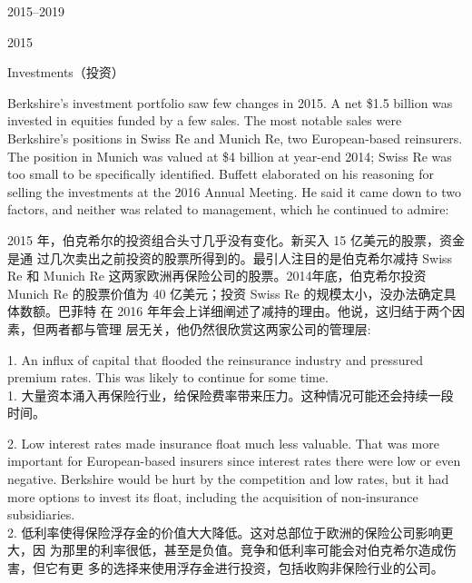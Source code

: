 \begin{chapter}{2015--2019}
\begin{section}{2015}
\begin{subsection}{Investments（投资）}
\begin{verseparallel}
{    Berkshire's investment portfolio saw few changes in 2015. A net \$1.5
    billion was invested in equities funded by a few sales. The most notable
    sales were Berkshire’s positions in Swiss Re and Munich Re, two
    European-based reinsurers. The position in Munich was valued at \$4 billion
    at year-end 2014; Swiss Re was too small to be specifically identified.
    Buffett elaborated on his reasoning for selling the investments at the 2016
    Annual Meeting. He said it came down to two factors, and neither was
    related to management, which he continued to admire:    

  }
  {
    2015 年，伯克希尔的投资组合头寸几乎没有变化。新买入 15 亿美元的股票，资金是通
    过几次卖出之前投资的股票所得到的。最引人注目的是伯克希尔减持 Swiss
    Re 和 Munich Re 这两家欧洲再保险公司的股票。2014年底，伯克希尔投资 Munich Re
    的股票价值为 40 亿美元；投资 Swiss Re 的规模太小，没办法确定具体数额。巴菲特
    在 2016 年年会上详细阐述了减持的理由。他说，这归结于两个因素，但两者都与管理
    层无关，他仍然很欣赏这两家公司的管理层:
  }
\end{verseparallel}    

{\color{green}{此处应为列表项 \\}}

\begin{verseparallel}
  {
    1. An influx of capital that flooded the reinsurance industry and pressured
    premium rates. This was likely to continue for some time. \\
  }
  {
    1. 大量资本涌入再保险行业，给保险费率带来压力。这种情况可能还会持续一段时间。
  }
\end{verseparallel}

\begin{verseparallel}
  {
    2. Low interest rates made insurance float much less valuable. That was more
    important for European-based insurers since interest rates there were low or
    even negative. Berkshire would be hurt by the competition and low rates, but
    it had more options to invest its float, including the acquisition of
    non-insurance subsidiaries. \\
  }
  {
    2. 低利率使得保险浮存金的价值大大降低。这对总部位于欧洲的保险公司影响更大，因
    为那里的利率很低，甚至是负值。竞争和低利率可能会对伯克希尔造成伤害，但它有更
    多的选择来使用浮存金进行投资，包括收购非保险行业的公司。
  }
\end{verseparallel}


\end{subsection}
\end{section}
\end{chapter}
